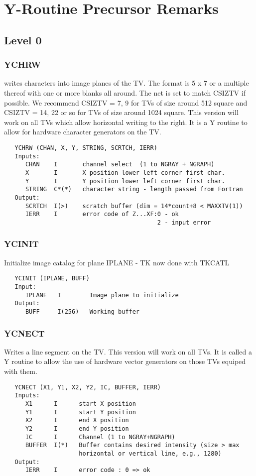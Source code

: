 \section{Y-Routine Precursor Remarks}
\subsection{Level 0}

\subsubsection{YCHRW}
writes characters into image planes of the TV.  The format is 5 x 7
or a multiple thereof with one or more blanks all around.  The net
is set to match CSIZTV if possible.  We recommend CSIZTV = 7, 9 for
TVs of size around 512 square and CSIZTV = 14, 22 or so for TVs of
size around 1024 square.  This version will work on all TVs which
allow horizontal writing to the right.  It is a Y routine to allow
for hardware character generators on the TV.
\begin{verbatim}
   YCHRW (CHAN, X, Y, STRING, SCRTCH, IERR)
   Inputs:
      CHAN    I       channel select  (1 to NGRAY + NGRAPH)
      X       I       X position lower left corner first char.
      Y       I       Y position lower left corner first char.
      STRING  C*(*)   character string - length passed from Fortran
   Output:
      SCRTCH  I(>)    scratch buffer (dim = 14*count+8 < MAXXTV(1))
      IERR    I       error code of Z...XF:0 - ok
                                           2 - input error
\end{verbatim}

\subsubsection{YCINIT}
Initialize image catalog for plane IPLANE - TK now done with TKCATL
\begin{verbatim}
   YCINIT (IPLANE, BUFF)
   Input:
      IPLANE   I        Image plane to initialize
   Output:
      BUFF     I(256)   Working buffer

\end{verbatim}

\subsubsection{YCNECT}
Writes a line segment on the TV.  This version will work on
all TVs.  It is called a Y routine to allow the use of hardware
vector generators on those TVs equiped with them.
\begin{verbatim}
   YCNECT (X1, Y1, X2, Y2, IC, BUFFER, IERR)
   Inputs:
      X1      I      start X position
      Y1      I      start Y position
      X2      I      end X position
      Y2      I      end Y position
      IC      I      Channel (1 to NGRAY+NGRAPH)
      BUFFER  I(*)   Buffer contains desired intensity (size > max
                     horizontal or vertical line, e.g., 1280)
   Output:
      IERR    I      error code : 0 => ok
\end{verbatim}

